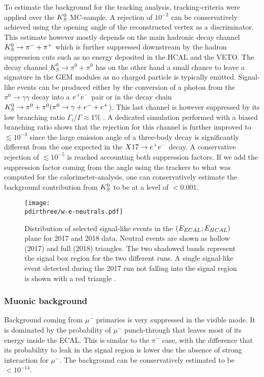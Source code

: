 To estimate the background for the tracking analysis, tracking-criteria were applied over the $K^0_S$ MC-sample. A rejection of $10^{-2}$ can be conservatively achieved using the opening angle of the reconstructed vertex as a discriminator. This estimate however mostly depends on the main hadronic decay channel $K^0_S \rightarrow \pi^- + \pi^+$ which is further suppressed downstream by the hadron suppression cuts such as no energy deposited in the HCAL and the VETO. The decay channel $K^0_S \rightarrow \pi^0 + \pi^0$ has on the other hand a small chance to leave a signature in the GEM modules as no charged particle is typically emitted. Signal-like events can be produced either by the conversion of a photon from the $\pi^0 \rightarrow \gamma \gamma$ decay into a $e^+e^-$ pair or in the decay chain $K^0_S \rightarrow \pi^0 + \pi^0 (\pi^0 \rightarrow \gamma + e^- + e^+$). This last channel is however suppressed by its low branching ratio $\Gamma_i$/$\Gamma \approx $1\% \cite{review-particle-physics}. A dedicated simulation performed with a biased branching ratio shows that the rejection for this channel is further improved to $\lesssim 10^{-3}$ since the large emission angle of a three-body decay is significantly different from the one expected in the $X17 \rightarrow e^+ e^-$ decay. A conservative rejection of $\lesssim 10^{-5}$ is reached accounting both suppression factors. If we add the suppression factor coming from the angle using the trackers to what was computed for the calorimeter-analysis, one can conservatively estimate the background contribution from $K^0_S$ to be at a level of $<0.001$.


\begin{figure}[bth!]
  \centering
  \texttt{[image: \\pdirthree/w-e-neutrals.pdf]}
  \caption[neutral events in visible mode]{Distribution of selected signal-like events in the $(E_{ECAL};E_{HCAL})$ plane for 2017 and 2018 data. Neutral events are shown as hollow (2017) and full (2018) triangles. The two shadowed bands represent the signal box region for the two different runs. A single signal-like event detected during the 2017 run not falling into the signal region is shown with a red triangle \cite{Banerjee:2019hmi}.}
  \label{fig:w-e-vis}
\end{figure}

\subsubsection{Muonic background}
\label{ch3:sec:bkg:vis:muon}

Background coming from $\mu^-$ primaries is very suppressed in the visible mode. It is dominated by the probability of $\mu^-$ punch-through that leaves most of its energy inside the ECAL. This is similar to the $\pi^-$ case, with the difference that its probability to leak in the signal region is lower due the absence of strong interaction for $\mu^-$. The background can be conservatively estimated to be $<10^{-14}$.

